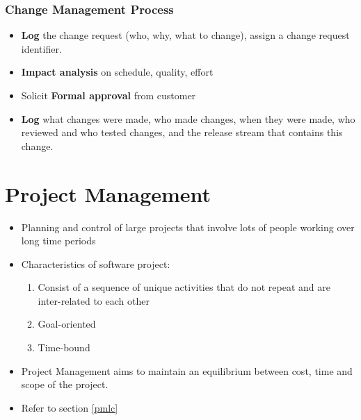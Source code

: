 \documentclass{article}
\begin{document}
\subsubsection{Change Management Process}
\begin{itemize}
    \item \textbf{Log} the change request (who, why, what to change), assign a change request identifier. 
    
    \item \textbf{Impact analysis} on schedule, quality, effort
    
    \item Solicit \textbf{Formal approval} from customer
    
    \item \textbf{Log} what changes were made, who made changes, when they were made, who reviewed and who tested changes, and the release stream that contains this change. 
\end{itemize}

\section{Project Management}
\begin{itemize}
    \item Planning and control of large projects that involve lots of people working over long time periods
    
    \item Characteristics of software project:
    \begin{enumerate}
        \item Consist of a sequence of unique activities that do not repeat and are inter-related to each other
        
        \item Goal-oriented
        
        \item Time-bound
    \end{enumerate}
    
    \item Project Management aims to maintain an equilibrium between cost, time and scope of the project.
    
    \item Refer to section \ref{pmlc} 
\end{itemize}
\end{document}
